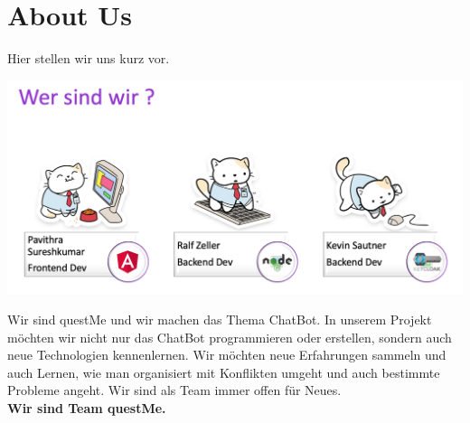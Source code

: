 \section{About Us}
\raggedright
Hier stellen wir uns kurz vor.
\\
\begin{center}
    \includegraphics[width=15cm]{bilder/aboutus/Screen Shot 2021-10-28 at 7.07.17 PM.png}
\end{center}
Wir sind questMe und wir machen das Thema ChatBot. 
In unserem Projekt möchten wir nicht nur das ChatBot programmieren oder erstellen, sondern auch neue Technologien kennenlernen.
Wir möchten neue Erfahrungen sammeln und auch Lernen, wie man organisiert mit Konflikten umgeht und auch bestimmte Probleme angeht.
Wir sind als Team immer offen für Neues.
\\

\textbf{Wir sind Team questMe.}
